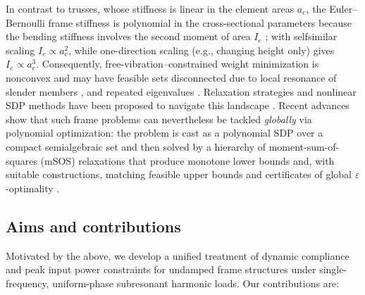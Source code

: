 \documentclass[preprint,3p]{elsarticle}
\numberwithin{equation}{section}
\begin{document}
In contrast to trusses, whose stiffness is linear in the element areas $a_e$, the Euler--Bernoulli frame stiffness is polynomial in the cross-sectional parameters because the bending stiffness involves the second moment of area $I_e$ \citep[Appendix A]{Tyburec2024global}; with selfsimilar scaling $I_e \propto a_e^2$, while one-direction scaling (e.g., changing height only) gives $I_e \propto a_e^3$. Consequently, free‑vibration–constrained weight minimization is nonconvex and may have feasible sets disconnected due to local resonance of slender members \citep{Ni2014}, and repeated eigenvalues \citep{Achtziger2008}. Relaxation strategies and nonlinear SDP methods have been proposed to navigate this landscape \citep{Yamada2015,Tyburec2024global}. Recent advances show that such frame problems can nevertheless be tackled \emph{globally} via polynomial optimization: the problem is cast as a polynomial SDP over a compact semialgebraic set and then solved by a hierarchy of moment-sum-of-squares (mSOS) relaxations that produce monotone lower bounds and, with suitable constructions, matching feasible upper bounds and certificates of global $\varepsilon$-optimality \citep{Tyburec2024global}.

\subsection{Aims and contributions}
Motivated by the above, we develop a unified treatment of dynamic compliance and peak input power constraints for undamped frame structures under single-frequency, uniform-phase subresonant harmonic loads. Our contributions are:
\end{document}
